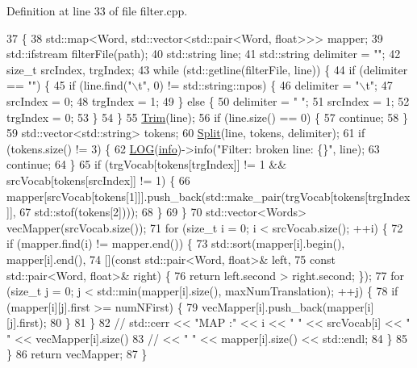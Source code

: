 Definition at line 33 of file filter.\+cpp.


\begin{DoxyCode}
37                                                                       \{
38   std::map<Word, std::vector<std::pair<Word, float>>> mapper;
39   std::ifstream filterFile(path);
40   std::string line;
41   std::string delimiter = \textcolor{stringliteral}{""};
42   \textcolor{keywordtype}{size\_t} srcIndex, trgIndex;
43   \textcolor{keywordflow}{while} (std::getline(filterFile, line)) \{
44     \textcolor{keywordflow}{if} (delimiter ==  \textcolor{stringliteral}{""}) \{
45        \textcolor{keywordflow}{if} (line.find(\textcolor{stringliteral}{"\(\backslash\)t"}, 0) != std::string::npos) \{
46          delimiter = \textcolor{stringliteral}{"\(\backslash\)t"};
47          srcIndex = 0;
48          trgIndex = 1;
49        \} \textcolor{keywordflow}{else}  \{
50          delimiter = \textcolor{stringliteral}{" "};
51          srcIndex = 1;
52          trgIndex = 0;
53        \}
54     \}
55     \hyperlink{namespaceamunmt_a4578e863aaec8293556404432d7e8d04}{Trim}(line);
56     \textcolor{keywordflow}{if} (line.size() == 0) \{
57       \textcolor{keywordflow}{continue};
58     \}
59     std::vector<std::string> tokens;
60     \hyperlink{namespaceamunmt_a10b7486d36b130609c77e8356218c0a7}{Split}(line, tokens, delimiter);
61     \textcolor{keywordflow}{if} (tokens.size() != 3) \{
62       \hyperlink{amun_2common_2logging_8h_a8cad147aca8c526d3c8a03ae14d5c87d}{LOG}(\hyperlink{namespacefix__hard_a31eedbb056537bc1bef47ad5e40eaa68}{info})->info(\textcolor{stringliteral}{"Filter: broken line: \{\}"}, line);
63       \textcolor{keywordflow}{continue};
64     \}
65     \textcolor{keywordflow}{if} (trgVocab[tokens[trgIndex]] != 1 && srcVocab[tokens[srcIndex]] != 1) \{
66       mapper[srcVocab[tokens[1]]].push\_back(std::make\_pair(trgVocab[tokens[trgIndex]],
67                                                            std::stof(tokens[2])));
68     \}
69   \}
70   std::vector<Words> vecMapper(srcVocab.size());
71   \textcolor{keywordflow}{for} (\textcolor{keywordtype}{size\_t} i = 0; i < srcVocab.size(); ++i) \{
72     \textcolor{keywordflow}{if} (mapper.find(i) != mapper.end()) \{
73       std::sort(mapper[i].begin(), mapper[i].end(),
74           [](\textcolor{keyword}{const} std::pair<Word, float>& left,
75             \textcolor{keyword}{const} std::pair<Word, float>& right) \{
76             \textcolor{keywordflow}{return} left.second > right.second; \});
77       \textcolor{keywordflow}{for} (\textcolor{keywordtype}{size\_t} j = 0; j < std::min(mapper[i].size(), maxNumTranslation); ++j) \{
78         \textcolor{keywordflow}{if} (mapper[i][j].first >= numNFirst) \{
79           vecMapper[i].push\_back(mapper[i][j].first);
80         \}
81       \}
82       \textcolor{comment}{// std::cerr << "MAP :" << i  << " " << srcVocab[i] << " " << vecMapper[i].size()}
83                 \textcolor{comment}{// <<  " " << mapper[i].size() << std::endl;}
84     \}
85   \}
86   \textcolor{keywordflow}{return} vecMapper;
87 \}
\end{DoxyCode}


